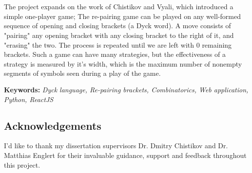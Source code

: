 \thispagestyle{empty}
\vspace*{\fill}

\section*{\center \abstractname}
The project expands on the work of Chistikov and Vyali, which introduced a simple one-player game; The re-pairing game can be played on any well-formed sequence of opening and closing brackets (a Dyck word). A move consists of "pairing" any opening bracket with any closing bracket to the right of it, and "erasing" the two. The process is repeated until we are left with 0 remaining brackets. Such a game can have many strategies, but the effectiveness of a strategy is measured by it's width, which is the maximum number of nonempty segments of symbols seen during a play of the game.
\par\null\par
\noindent \textbf{Keywords:} \textit{Dyck language, Re-pairing brackets, Combinatorics, Web application, Python, ReactJS}

\vspace{10mm}

\begin{center}

\section*{Acknowledgements}
I'd like to thank my dissertation supervisors Dr. Dmitry Chistikov and Dr. Matthias Englert for their invaluable guidance, support and feedback throughout this project. 

\end{center}
\vspace*{\fill}